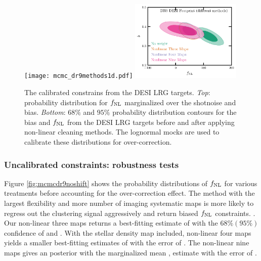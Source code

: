\begin{figure}
    \raggedleft
    \texttt{[image: mcmc\_dr9methods1d.pdf]}
    \includegraphics[width=0.47\textwidth, trim={0 0 0.15cm 0.2cm},clip]{figures/mcmc_dr9methods.pdf} 
    \caption{The calibrated constrains from the DESI LRG targets. \textit{Top}: probability distribution for $f_{\rm NL}$ marginalized over the shotnoise and bias. \textit{Bottom}: $68\%$ and $95\%$ probability distribution contours for the bias and $f_{\rm NL}$ from the DESI LRG targets before and after applying non-linear cleaning methods. The lognormal mocks are used to calibrate these distributions for over-correction.}\label{fig:mcmc_dr9}
\end{figure}

\subsubsection{Uncalibrated constraints: robustness tests}
Figure \ref{fig:mcmcdr9noshift} shows the probability distributions of $f_{\rm NL}$ for various treatments before accounting for the over-correction effect. The method with the largest flexibility and more number of imaging systematic maps is more likely to regress out the clustering signal aggressively and return biased $f_{\rm NL}$ constraints. . Our non-linear three maps returns a best-fitting estimate of  with the $68\%(95\%)$ confidence of  and . With the stellar density map included, non-linear four maps yields a smaller best-fitting estimates of  with the error of . The non-linear nine maps gives an  posterior with the marginalized mean ,  estimate  with the error of . 

